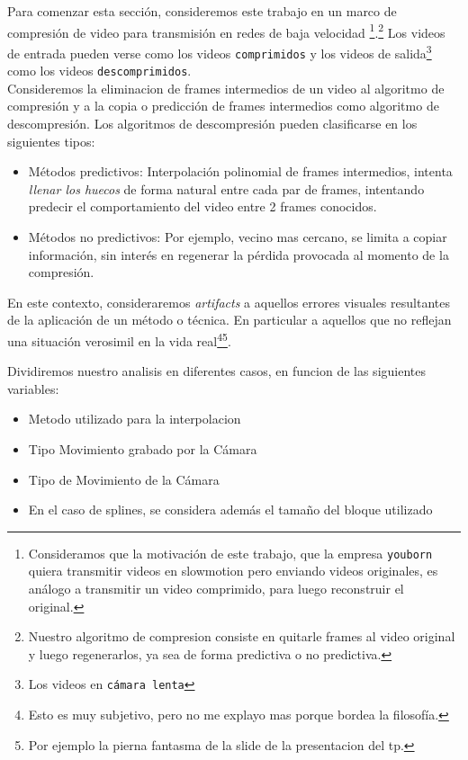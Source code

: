 Para comenzar esta sección, consideremos este trabajo en un marco de compresión de video para transmisión en redes de baja velocidad \footnote{Consideramos que la motivación de este trabajo, que la empresa \texttt{youborn} quiera transmitir videos en slowmotion pero enviando videos originales, es análogo a transmitir un video comprimido, para luego reconstruir el original.}.\footnote{Nuestro algoritmo de compresion consiste en quitarle frames al video original y luego regenerarlos, ya sea de forma predictiva o no predictiva.} Los videos de entrada pueden verse como los videos \texttt{comprimidos} y los videos de salida\footnote{Los videos en \texttt{cámara lenta}} como los videos \texttt{descomprimidos}.\\

Consideremos la eliminacion de frames intermedios de un video al algoritmo de compresión y a la copia o predicción de frames intermedios como algoritmo de descompresión. Los algoritmos de descompresión pueden clasificarse en los siguientes tipos:
\begin{itemize}
	\item Métodos predictivos: Interpolación polinomial de frames intermedios, intenta \emph{llenar los huecos} de forma natural entre cada par de frames, intentando predecir el comportamiento del video entre 2 frames conocidos.
	\item Métodos no predictivos: Por ejemplo, vecino mas cercano, se limita a copiar información, sin interés en regenerar la pérdida provocada al momento de la compresión.
\end{itemize}

En este contexto, consideraremos \emph{artifacts} a aquellos errores visuales resultantes de la aplicaci\'on de un m\'etodo o t\'ecnica. En particular a aquellos que no reflejan una situación verosimil en la vida real\footnote{Esto es muy subjetivo, pero no me explayo mas porque bordea la filosofía.}\footnote{Por ejemplo la pierna fantasma de la slide de la presentacion del tp.}.

Dividiremos nuestro analisis en diferentes casos, en funcion de las siguientes variables:
\begin{itemize}
	\item Metodo utilizado para la interpolacion
	\item Tipo Movimiento grabado por la Cámara
	\item Tipo de Movimiento de la Cámara
	\item En el caso de splines, se considera además el tamaño del bloque utilizado
\end{itemize}

